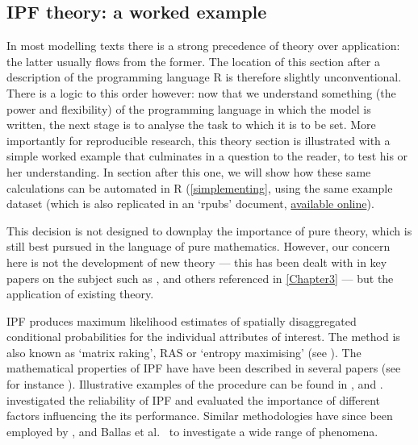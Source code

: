 \documentclass[a4paper,10pt]{article}
\title{}
\author{}
\begin{document}
\maketitle

\begin{abstract}

\end{abstract}

\subsection{IPF theory: a worked example} \label{s:theory}
In most modelling texts there is a strong precedence of theory over
application: the latter usually flows from the former. The
location of this section after a description of the programming language
R is therefore
slightly unconventional. There is a logic to this order however: now that we
understand something (the power and flexibility) of the programming language in
which the model is written, the next stage is to analyse the task to which it
is to be set. More importantly for reproducible research, this theory section
is illustrated with a simple worked example that culminates in
a question to the reader, to test his or her understanding.
In section after this one, we will show how these same calculations can be
automated in R (\cref{simplementing}, using the same example dataset
(which is also replicated in an `rpubs' document,
\href{http://rpubs.com/RobinLovelace/6193}{available online}).

This decision is not designed to downplay the importance of pure theory, which
is still best pursued in the language of pure mathematics. However,
our concern here is not the development of new theory --- this has been dealt
with in key papers on the subject such as \citep{Williamson1998},
\citep{Pritchard2012} and
others referenced in \cref{Chapter3} --- but
the application of existing theory.

IPF produces maximum likelihood estimates of spatially
disaggregated conditional probabilities for the individual attributes of
interest.
The method is also known as `matrix raking', RAS
or `entropy maximising'
(see \citealp{Johnston1993, Birkin1988, Muller2010, Huang2001a,
Simpson2005, Kalantari2008, Jirousek1995}).
The mathematical properties of IPF
have have been described in several papers
(see for instance \citealp{Bishop1975, Fienberg1970, Birkin1988}).
Illustrative examples of the procedure can be found in
\citet{Saito1992}, \citet{Wong1992}
and \citet{Norman1999a}.
\citet{Wong1992} investigated the reliability of IPF and evaluated
the importance of different factors influencing the its performance.
Similar methodologies have since been employed by
\citet{Mitchell2000}, \citet{Williamson2002} and
Ballas et al.~\citeyearpar{Ballas2005c, Ballas2005}
to investigate a wide range of phenomena.
\end{document}
